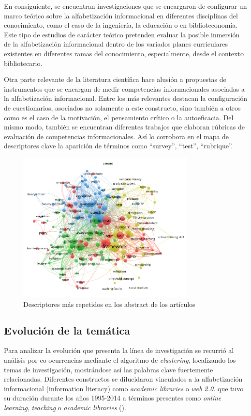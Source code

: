 \documentclass[spanish]{textolivre}
\begin{document}
En consiguiente, se encuentran investigaciones que se encargaron de configurar un marco teórico sobre la alfabetización informacional en diferentes disciplinas del conocimiento, como el caso de la ingeniería, la educación o en biblioteconomía. Este tipo de estudios de carácter teórico pretenden evaluar la posible inmersión de la alfabetización informacional dentro de los variados planes curriculares existentes en diferentes ramas del conocimiento, especialmente, desde el contexto bibliotecario.

Otra parte relevante de la literatura científica hace alusión a propuestas de instrumentos que se encargan de medir competencias informacionales asociadas a la alfabetización informacional. Entre los más relevantes destacan la configuración de cuestionarios, asociados no solamente a este constructo, sino también a otros como es el caso de la motivación, el pensamiento crítico o la autoeficacia. Del mismo modo, también se encuentran diferentes trabajos que elaboran rúbricas de evaluación de competencias informacionales. Así lo corrobora en el mapa de descriptores clave la aparición de términos como “survey”, “test”, “rubrique”.

\begin{figure}[h!]
 \centering
 \includegraphics[width=0.8\textwidth]{fig3.png}
 \caption{Descriptores más repetidos en los abstract de los artículos}
 \label{fig3}
\end{figure}

\subsection{Evolución de la temática}
Para analizar la evolución que presenta la línea de investigación se recurrió al análisis por co-ocurrencias mediante el algoritmo de \emph{clustering}, localizando los temas de investigación, mostrándose así las palabras clave fuertemente relacionadas. Diferentes constructos se dilucidaron vinculados a la alfabetización informacional (information literacy) como \emph{academic libraries} o \emph{web 2.0.} que tuvo su duración durante los años 1995-2014 a términos presentes como \emph{online learning}, \emph{teaching} o \emph{academic libraries} ().
\end{document}
